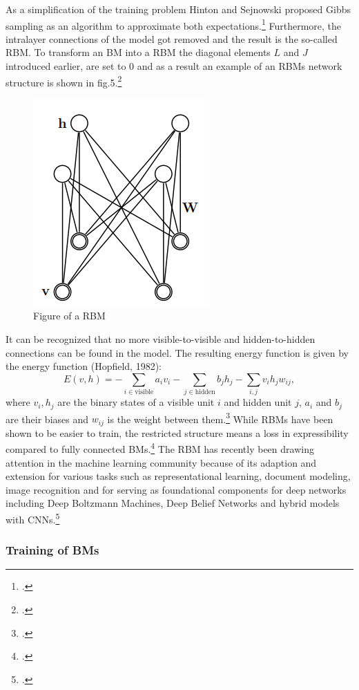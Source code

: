 As a simplification of the training problem Hinton and Sejnowski proposed Gibbs sampling as an algorithm to approximate both expectations.\footcite[cf.][158-165]{ackleyLearningAlgorithmBoltzmann1985}
Furthermore, the intralayer connections of the model got removed and the result is the so-called \ac{RBM}.
To transform an \ac{BM} into a \ac{RBM} the diagonal elements \( L \) and \( J \)  introduced earlier, are set to 0 and as a result an example of an \ac{RBM}s network structure is shown in fig.5.\footcite[cf.][449]{salakhutdinovDeepBoltzmannMachines2009}

\begin{figure}[H]
    \centering
    \includegraphics[width=0.25\linewidth]{graphics/RBM_Modell.png}
    \caption{Figure of a RBM}
\end{figure}
It can be recognized that no more visible-to-visible and hidden-to-hidden connections can be found in the model.
The resulting energy function is given by the energy function (Hopfield, 1982):
\begin{equation}
E(v, h) = - \sum_{i \in \text{visible}} a_i v_i - \sum_{j \in \text{hidden}} b_j h_j - \sum_{i,j} v_i h_j w_{ij},
\end{equation}
where \( v_i, h_j \) are the binary states of a visible unit \( i \) and hidden unit \( j \), \( a_i \) and  \(  b_j \) are their biases and \( w_{ij} \) is the weight between them.\footcite[cf.][3-4]{hintonPracticalGuideTraining2012a}
While \ac{RBM}s have been shown to be easier to train, the restricted structure means a loss in expressibility compared to fully connected \ac{BM}s.\footcite[cf.][4]{huembeliPhysicsEnergybasedModels2022}
The \ac{RBM} has recently been drawing attention in the machine learning community because of its adaption and extension for various tasks such as representational learning, document modeling, image recognition and for
serving as foundational components for deep networks including Deep Boltzmann Machines, Deep Belief Networks and hybrid models with CNNs.\footcite[cf.][1186]{zhangOverviewRestrictedBoltzmann2018}

\subsubsection{Training of \ac{BM}s}

